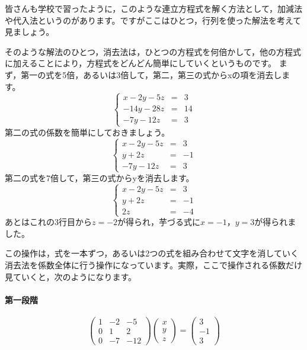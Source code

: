 \documentclass{ltjsbook}
\begin{document}
皆さんも学校で習ったように，このような連立方程式を解く方法として，加減法や代入法というのがあります。ですがここはひとつ，行列を使った解法を考えて見ましょう。

そのような解法のひとつ，消去法は，ひとつの方程式を何倍かして，他の方程式に加えることにより，方程式をどんどん簡単にしていくというものです。
まず，第一の式を5倍，あるいは3倍して，第二，第三の式からxの項を消去します。
\[ \left \{
    \begin{array}{rcl}
        x-2y-5z  & = & 3  \\
        -14y-28z & = & 14 \\
        -7y-12z  & = & 3
    \end{array}
    \right .
\]
第二の式の係数を簡単にしておきましょう。
\[ \left \{
    \begin{array}{rcl}
        x-2y-5z & = & 3  \\
        y+2z    & = & -1 \\
        -7y-12z & = & 3
    \end{array}
    \right .
\]
第二の式を7倍して，第三の式からyを消去します。
\[ \left \{
    \begin{array}{rcl}
        x-2y-5z & = & 3  \\
        y+2z    & = & -1 \\
        2z      & = & -4
    \end{array}
    \right .
\]
あとはこれの3行目から$z=-2$が得られ，芋づる式に$x=-1$，$y=3$が得られました。


この操作は，式を一本ずつ，あるいは2つの式を組み合わせて文字を消していく消去法を係数全体に行う操作になっています。実際，ここで操作される係数だけ見ていくと，次のようになります。

\paragraph{第一段階}
\[
    \begin{pmatrix} 1 & -2 & -5  \\
                0 & 1  & 2   \\
                0 & -7 & -12\end{pmatrix}
    \begin{pmatrix} x \\ y \\ z \end{pmatrix}
    =
    \begin{pmatrix} 3 \\ -1 \\ 3 \end{pmatrix}
\]
\end{document}

